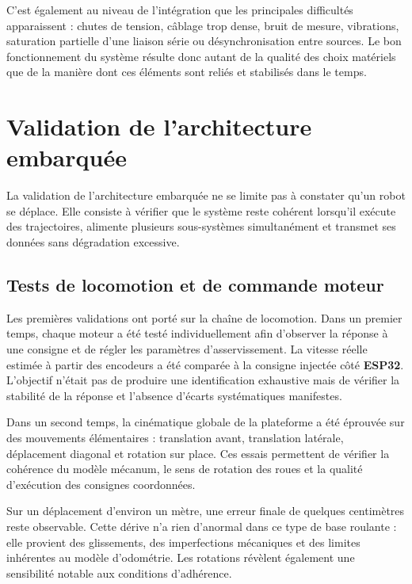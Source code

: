 \documentclass[11pt,a4paper]{report}
\newcommand{\kw}[1]{\textbf{#1}}
\begin{document}
C’est également au niveau de l’intégration que les principales difficultés apparaissent : chutes de tension, câblage trop dense, bruit de mesure, vibrations, saturation partielle d’une liaison série ou désynchronisation entre sources. Le bon fonctionnement du système résulte donc autant de la qualité des choix matériels que de la manière dont ces éléments sont reliés et stabilisés dans le temps.

\section{Validation de l'architecture embarquée}

La validation de l’architecture embarquée ne se limite pas à constater qu’un robot se déplace. Elle consiste à vérifier que le système reste cohérent lorsqu’il exécute des trajectoires, alimente plusieurs sous-systèmes simultanément et transmet ses données sans dégradation excessive.

\subsection{Tests de locomotion et de commande moteur}

Les premières validations ont porté sur la chaîne de locomotion. Dans un premier temps, chaque moteur a été testé individuellement afin d’observer la réponse à une consigne et de régler les paramètres d’asservissement. La vitesse réelle estimée à partir des encodeurs a été comparée à la consigne injectée côté \kw{ESP32}. L’objectif n’était pas de produire une identification exhaustive mais de vérifier la stabilité de la réponse et l’absence d’écarts systématiques manifestes.

Dans un second temps, la cinématique globale de la plateforme a été éprouvée sur des mouvements élémentaires : translation avant, translation latérale, déplacement diagonal et rotation sur place. Ces essais permettent de vérifier la cohérence du modèle mécanum, le sens de rotation des roues et la qualité d’exécution des consignes coordonnées.

Sur un déplacement d’environ un mètre, une erreur finale de quelques centimètres reste observable. Cette dérive n’a rien d’anormal dans ce type de base roulante : elle provient des glissements, des imperfections mécaniques et des limites inhérentes au modèle d’odométrie. Les rotations révèlent également une sensibilité notable aux conditions d’adhérence.
\end{document}
